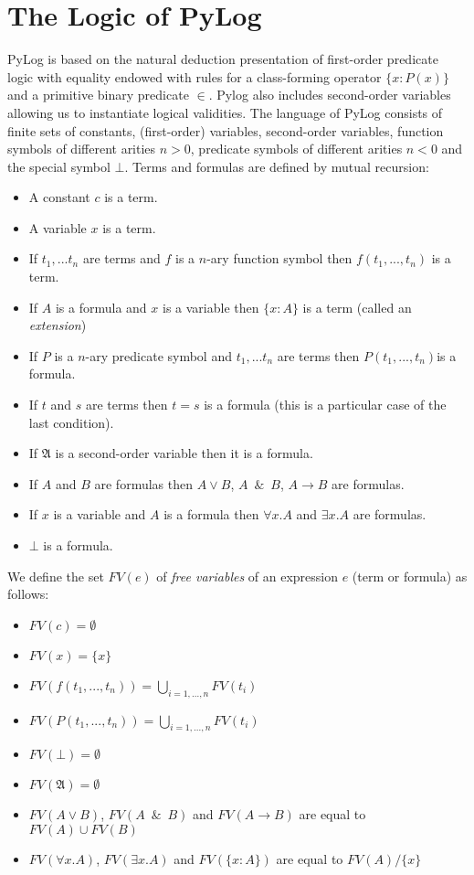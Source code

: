 \documentclass[a4paper,12pt,leqno]{article}
\numberwithin{equation}{section}
\begin{document}
 
 
 \section*{The Logic of PyLog}
 
 PyLog is based on the natural deduction presentation of first-order predicate logic with equality endowed with rules for a class-forming operator $\{x: P(x)\}$ and a primitive binary predicate $\in$.
 Pylog also includes second-order variables  allowing  us to instantiate logical validities.
 The language of PyLog consists of finite sets of constants, (first-order) variables, second-order variables,  function symbols of different arities $n >0$, predicate symbols of different arities $n<0$ and the special symbol $\bot$.
 Terms and formulas are defined by mutual recursion:
 
 
 \begin{itemize}
 \item A constant $c$ is a term.
 \item A variable $x$ is a term.
 \item If $t_1,...t_n$ are terms and $f$ is a $n$-ary function symbol then $f(t_1,...,t_n)$ is a term.
 \item If $A$ is a formula and $x$ is a variable then $\{x : A\}$ is a term (called an \emph{extension})
 \item If $P$ is a $n$-ary predicate symbol and $t_1,...t_n$ are terms then $P(t_1,...,t_n)$is a formula.
 \item If $t$ and $s$ are terms then $t=s$ is a formula (this is a particular case of the last condition).
 \item If $\mathfrak{A}$ is a second-order variable then it is a formula.
 \item If $A$ and $B$ are formulas then $A\vee B$, $A\enspace \&\enspace B$, $A\rightarrow B$ are formulas.
 \item If $x$ is a variable and $A$ is a formula then $\forall x.A$ and $\exists x.A$ are formulas.
 \item $\bot$ is a formula.
 \end{itemize}


We define the set $FV(e)$ of \emph{free variables} of an expression $e$ (term or formula) as follows:


\begin{itemize}
	\item $FV(c) = \emptyset$
	\item $FV(x) = \{x\}$
	\item $FV(f(t_1,...,t_n)) = \bigcup_{i=1,...,n} FV(t_i)$
		\item $FV(P(t_1,...,t_n)) = \bigcup_{i=1,...,n} FV(t_i)$
	\item $FV(\bot) = \emptyset$
	\item $FV(\mathfrak{A}) = \emptyset$
	\item $FV(A\vee B)$, $FV(A\enspace\&\enspace B)$ and  $FV(A\rightarrow B)$ are equal to $FV(A) \cup FV(B)$
   \item $FV(\forall x.A)$, $FV(\exists x.A)$ and $FV(\{x: A\})$ are equal to $FV(A)/\{x\}$ 
\end{itemize}
\end{document}
